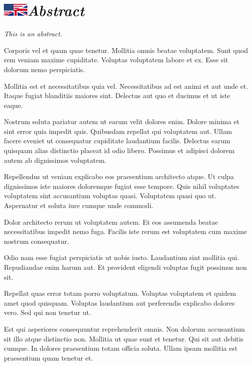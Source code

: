 \chapter[Résumé (anglais)]{\includegraphics[height=18pt]{Front/Figures/US-UK_flag.pdf}\hspace{1em}\itshape Abstract}

{\itshape
This is an abstract.

Corporis vel et quam quae tenetur. Mollitia omnis beatae voluptatem. Sunt quod rem veniam maxime cupiditate. Voluptas voluptatem labore et ex. Esse sit dolorum nemo perspiciatis.

Mollitia est et necessitatibus quia vel. Necessitatibus ad est animi et aut unde et. Itaque fugiat blanditiis maiores sint. Delectus aut quo et ducimus et ut iste eaque.

Nostrum soluta pariatur autem ut earum velit dolores enim. Dolore minima et sint error quia impedit quis. Quibusdam repellat qui voluptatem aut. Ullam facere eveniet ut consequatur cupiditate laudantium facilis. Delectus earum quisquam alias distinctio placeat id odio libero. Possimus et adipisci dolorem autem ab dignissimos voluptatem.

Repellendus ut veniam explicabo eos praesentium architecto atque. Ut culpa dignissimos iste maiores doloremque fugiat esse tempore. Quis nihil voluptates voluptatem sint accusantium voluptas quasi. Voluptatem quasi quo ut. Aspernatur et soluta iure cumque unde commodi.

Dolor architecto rerum ut voluptatem autem. Et eos assumenda beatae necessitatibus impedit nemo fuga. Facilis iste rerum est voluptatem cum maxime nostrum consequatur.

Odio nam esse fugiat perspiciatis ut nobis iusto. Laudantium sint mollitia qui. Repudiandae enim harum aut. Et provident eligendi voluptas fugit possimus non sit.

Repellat quas error totam porro voluptatum. Voluptas voluptatem et quidem amet quod quisquam. Voluptas laudantium aut perferendis explicabo dolores vero. Sed qui non tenetur ut.

Est qui asperiores consequuntur reprehenderit omnis. Non dolorum accusantium sit illo atque distinctio non. Mollitia ut quae sunt et tenetur. Qui sit aut debitis cumque. In dolores praesentium totam officia soluta. Ullam ipsam mollitia est praesentium quam tenetur et.
}
